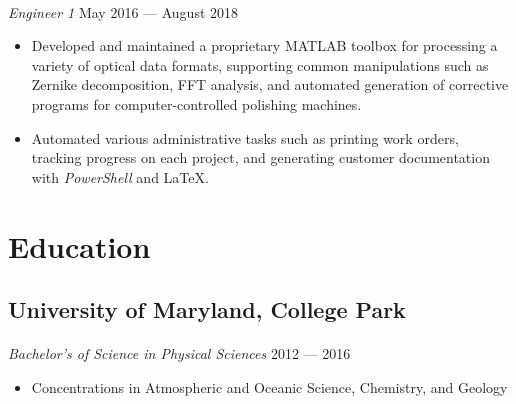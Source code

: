 \documentclass[10pt]{article}
\begin{document}
\paragraph{}
\textit{Engineer 1} \hfill May 2016 --- August 2018
\begin{itemize}
  \item Developed and maintained a proprietary MATLAB toolbox for processing a
    variety of optical data formats, supporting common manipulations such as
    Zernike decomposition, FFT analysis, and automated generation of corrective
    programs for computer-controlled polishing machines.
  \item Automated various administrative tasks such as printing work orders,
    tracking progress on each project, and generating customer documentation
    with \textit{PowerShell} and \LaTeX.
\end{itemize}

\dotfill

\section*{Education}
\subsection*{University of Maryland, College Park}
\paragraph{}
\textit{Bachelor's of Science in Physical Sciences} \hfill 2012 --- 2016

\begin{itemize}
  \item Concentrations in Atmospheric and Oceanic Science, Chemistry, and Geology
\end{itemize}
\end{document}
